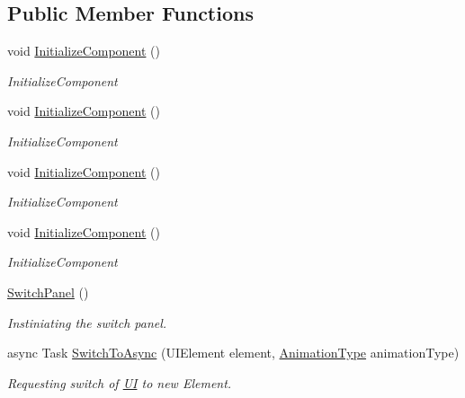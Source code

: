\subsection*{Public Member Functions}
\begin{DoxyCompactItemize}
\item 
void \mbox{\hyperlink{class_wpf_handler_1_1_u_i_1_1_controls_1_1_switch_panel_a9a8e8f316052b03ca360d48a507e8734}{Initialize\+Component}} ()
\begin{DoxyCompactList}\small\item\em Initialize\+Component \end{DoxyCompactList}\item 
void \mbox{\hyperlink{class_wpf_handler_1_1_u_i_1_1_controls_1_1_switch_panel_a9a8e8f316052b03ca360d48a507e8734}{Initialize\+Component}} ()
\begin{DoxyCompactList}\small\item\em Initialize\+Component \end{DoxyCompactList}\item 
void \mbox{\hyperlink{class_wpf_handler_1_1_u_i_1_1_controls_1_1_switch_panel_a9a8e8f316052b03ca360d48a507e8734}{Initialize\+Component}} ()
\begin{DoxyCompactList}\small\item\em Initialize\+Component \end{DoxyCompactList}\item 
void \mbox{\hyperlink{class_wpf_handler_1_1_u_i_1_1_controls_1_1_switch_panel_a9a8e8f316052b03ca360d48a507e8734}{Initialize\+Component}} ()
\begin{DoxyCompactList}\small\item\em Initialize\+Component \end{DoxyCompactList}\item 
\mbox{\hyperlink{class_wpf_handler_1_1_u_i_1_1_controls_1_1_switch_panel_a66b597d71d605434b2f51276feff9c8b}{Switch\+Panel}} ()
\begin{DoxyCompactList}\small\item\em Instiniating the switch panel. \end{DoxyCompactList}\item 
async Task \mbox{\hyperlink{class_wpf_handler_1_1_u_i_1_1_controls_1_1_switch_panel_a1797a0bb1de37134c2ed133718cdcee4}{Switch\+To\+Async}} (U\+I\+Element element, \mbox{\hyperlink{class_wpf_handler_1_1_u_i_1_1_controls_1_1_switch_panel_aad6e1d850ec0101cc8d98c259971e272}{Animation\+Type}} animation\+Type)
\begin{DoxyCompactList}\small\item\em Requesting switch of \mbox{\hyperlink{namespace_wpf_handler_1_1_u_i}{UI}} to new Element. \end{DoxyCompactList}\end{DoxyCompactItemize}

